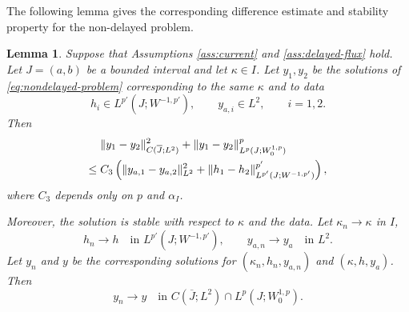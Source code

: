 \documentclass[a4paper,11pt,oneside,reqno]{amsart}
\newtheorem{lemma}[theorem]{Lemma}
\newcounter{c}
\newcounter{d}
\newcounter{b}
\begin{document}
The following lemma gives the corresponding difference estimate and
stability property for the non-delayed problem.

\begin{lemma}\label{lem:nondelayed-stability}
Suppose that Assumptions \ref{ass:current} and
\ref{ass:delayed-flux} hold.  Let \(J=(a,b)\) be a bounded interval and
let \(\kappa\in I\).  Let \(y_1,y_2\) be the solutions of
\eqref{eq:nondelayed-problem} corresponding to the same \(\kappa\) and
to data
\[
 h_i\in L^{p'}(J;W^{-1,p'}),\qquad y_{a,i}\in L^2,
 \qquad i=1,2.
\]
Then
\begin{align}
 &\|y_1-y_2\|_{C(\overline J;L^2)}^2
 +\|y_1-y_2\|_{L^p(J;W^{1,p}_0)}^p
 \notag\\
 \le{}&
 C_3\left(
 \|y_{a,1}-y_{a,2}\|_{L^2}^2
 +\|h_1-h_2\|_{L^{p'}(J;W^{-1,p'})}^{p'}
 \right),
 \label{eq:nondelayed-difference}
\end{align}
where \(C_3\) depends only on \(p\) and \(\alpha_I\).

Moreover, the solution is stable with respect to \(\kappa\) and the data.
Let \(\kappa_n\to\kappa\) in \(I\),
\[
 h_n\to h
  \quad\text{in }L^{p'}(J;W^{-1,p'}),
 \qquad
 y_{a,n}\to y_a
 \quad\text{in }L^2.
\]
Let \(y_n\) and \(y\) be the corresponding solutions for
\((\kappa_n,h_n,y_{a,n})\) and \((\kappa,h,y_a)\).  Then
\[
 y_n\to y
 \quad\text{in }
 C(\overline J;L^2)\cap L^p(J;W^{1,p}_0).
\]
\end{lemma}
\end{document}
